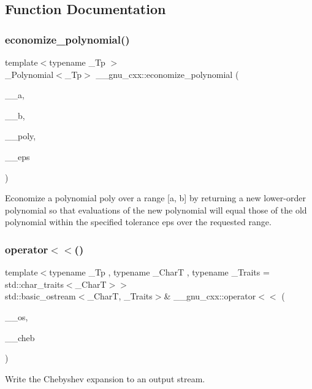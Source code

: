 \subsection{Function Documentation}
\mbox{\label{namespace____gnu__cxx_a917fd750f0e3fb9fd440bf3ecf72c97b}} 
\subsubsection{\texorpdfstring{economize\+\_\+polynomial()}{economize\_polynomial()}}
{\footnotesize\ttfamily template$<$typename \+\_\+\+Tp $>$ \\
\+\_\+\+Polynomial$<$\+\_\+\+Tp$>$ \+\_\+\+\_\+gnu\+\_\+cxx\+::economize\+\_\+polynomial (\begin{DoxyParamCaption}\item[{\+\_\+\+Tp}]{\+\_\+\+\_\+a,  }\item[{\+\_\+\+Tp}]{\+\_\+\+\_\+b,  }\item[{const \+\_\+\+Polynomial$<$ \+\_\+\+Tp $>$ \&}]{\+\_\+\+\_\+poly,  }\item[{\+\_\+\+Tp}]{\+\_\+\+\_\+eps }\end{DoxyParamCaption})}

Economize a polynomial poly over a range \mbox{[}a, b\mbox{]} by returning a new lower-\/order polynomial so that evaluations of the new polynomial will equal those of the old polynomial within the specified tolerance eps over the requested range. \mbox{\label{namespace____gnu__cxx_ae90394e47a70b69b61486e43a7c13116}} 
\subsubsection{\texorpdfstring{operator$<$$<$()}{operator<<()}}
{\footnotesize\ttfamily template$<$typename \+\_\+\+Tp , typename \+\_\+\+CharT , typename \+\_\+\+Traits  = std\+::char\+\_\+traits$<$\+\_\+\+Char\+T$>$$>$ \\
std\+::basic\+\_\+ostream$<$\+\_\+\+CharT, \+\_\+\+Traits$>$\& \+\_\+\+\_\+gnu\+\_\+cxx\+::operator$<$$<$ (\begin{DoxyParamCaption}\item[{std\+::basic\+\_\+ostream$<$ \+\_\+\+CharT, \+\_\+\+Traits $>$ \&}]{\+\_\+\+\_\+os,  }\item[{const \hyperlink{class____gnu__cxx_1_1__Chebyshev}{\+\_\+\+Chebyshev}$<$ \+\_\+\+Tp $>$ \&}]{\+\_\+\+\_\+cheb }\end{DoxyParamCaption})}

Write the Chebyshev expansion to an output stream. 